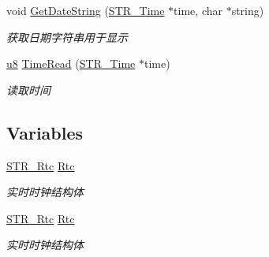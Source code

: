 \begin{DoxyCompactItemize}
void \hyperlink{group___r_t_c_ga4f14b7b7736d3f689f1abecd195458f1}{\-Get\-Date\-String} (\hyperlink{struct_s_t_r___time}{\-S\-T\-R\-\_\-\-Time} $\ast$time, char $\ast$string)
\begin{DoxyCompactList}\small\item\em 获取日期字符串用于显示 \end{DoxyCompactList}\item 
\hypertarget{group___r_t_c_gac03799b56ed83e28e102088590349d25}{\hyperlink{group___b_s_p_gaed742c436da53c1080638ce6ef7d13de}{u8} \hyperlink{group___r_t_c_gac03799b56ed83e28e102088590349d25}{\-Time\-Read} (\hyperlink{struct_s_t_r___time}{\-S\-T\-R\-\_\-\-Time} $\ast$time)}\label{group___r_t_c_gac03799b56ed83e28e102088590349d25}

\begin{DoxyCompactList}\small\item\em 读取时间 \end{DoxyCompactList}\end{DoxyCompactItemize}
\subsection*{\-Variables}
\begin{DoxyCompactItemize}
\item 
\hypertarget{group___r_t_c_gac4564180c5a6381255467f7e41f2fdc0}{\hyperlink{struct_s_t_r___rtc}{\-S\-T\-R\-\_\-\-Rtc} \hyperlink{group___r_t_c_gac4564180c5a6381255467f7e41f2fdc0}{\-Rtc}}\label{group___r_t_c_gac4564180c5a6381255467f7e41f2fdc0}

\begin{DoxyCompactList}\small\item\em 实时时钟结构体 \end{DoxyCompactList}\item 
\hypertarget{group___r_t_c_gac4564180c5a6381255467f7e41f2fdc0}{\hyperlink{struct_s_t_r___rtc}{\-S\-T\-R\-\_\-\-Rtc} \hyperlink{group___r_t_c_gac4564180c5a6381255467f7e41f2fdc0}{\-Rtc}}\label{group___r_t_c_gac4564180c5a6381255467f7e41f2fdc0}

\begin{DoxyCompactList}\small\item\em 实时时钟结构体 \end{DoxyCompactList}\end{DoxyCompactItemize}


